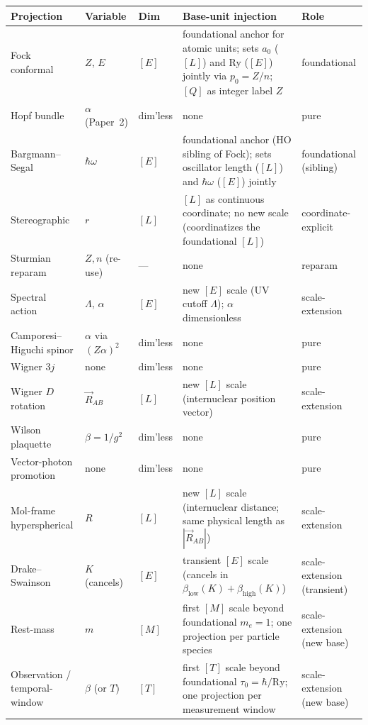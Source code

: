 \documentclass[11pt]{article}
\begin{document}
\begin{table}[h]
\centering\small
\begin{tabular}{p{3cm} p{2.2cm} p{0.9cm} p{4.5cm} p{1.6cm}}
\toprule
Projection & Variable & Dim & Base-unit injection & Role \\
\midrule
Fock conformal & $Z$, $E$ & $[E]$ &
foundational anchor for atomic units; sets $a_0$ ($[L]$) and Ry
($[E]$) jointly via $p_0 = Z/n$; $[Q]$ as integer label $Z$ &
foundational \\
Hopf bundle & $\alpha$ (Paper~2) & dim'less & none & pure \\
Bargmann--Segal & $\hbar\omega$ & $[E]$ &
foundational anchor (HO sibling of Fock); sets oscillator length
($[L]$) and $\hbar\omega$ ($[E]$) jointly &
foundational (sibling) \\
Stereographic & $r$ & $[L]$ & $[L]$ as continuous coordinate; no new
scale (coordinatizes the foundational $[L]$) &
coordinate-explicit \\
Sturmian reparam & $Z, n$ (re-use) & --- & none & reparam \\
Spectral action & $\Lambda$, $\alpha$ & $[E]$ & new $[E]$ scale (UV
cutoff $\Lambda$); $\alpha$ dimensionless & scale-extension \\
Camporesi--Higuchi spinor & $\alpha$ via $(Z\alpha)^2$ & dim'less &
none & pure \\
Wigner $3j$ & none & dim'less & none & pure \\
Wigner $D$ rotation & $\vec{R}_{AB}$ & $[L]$ & new $[L]$ scale
(internuclear position vector) & scale-extension \\
Wilson plaquette & $\beta = 1/g^2$ & dim'less & none & pure \\
Vector-photon promotion & none & dim'less & none & pure \\
Mol-frame hyperspherical & $R$ & $[L]$ & new $[L]$ scale
(internuclear distance; same physical length as $|\vec{R}_{AB}|$) &
scale-extension \\
Drake--Swainson & $K$ (cancels) & $[E]$ & transient $[E]$ scale
(cancels in $\beta_\text{low}(K) + \beta_\text{high}(K)$) &
scale-extension (transient) \\
Rest-mass & $m$ & $[M]$ & first $[M]$ scale beyond foundational
$m_e = 1$; one projection per particle species &
scale-extension (new base) \\
Observation / temporal-window & $\beta$ (or $T$) & $[T]$ & first
$[T]$ scale beyond foundational $\tau_0 = \hbar/\mathrm{Ry}$; one
projection per measurement window &
scale-extension (new base) \\

\end{tabular}
\end{table}
\end{document}
